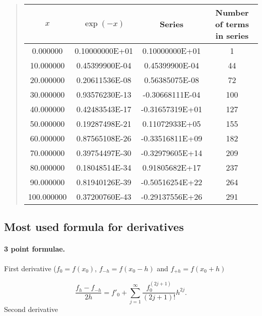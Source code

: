 \documentclass[%
oneside,                 %
final,                   %
10pt]{article}
\begin{document}
\begin{quote}
\begin{tabular}{cccc}
\hline
\multicolumn{1}{c}{ $x$ } & \multicolumn{1}{c}{ $\exp{(-x)}$ } & \multicolumn{1}{c}{ Series } & \multicolumn{1}{c}{ Number of terms in series } \\
\hline
0.000000   & 0.10000000E+01 & 0.10000000E+01  & 1                         \\
10.000000  & 0.45399900E-04 & 0.45399900E-04  & 44                        \\
20.000000  & 0.20611536E-08 & 0.56385075E-08  & 72                        \\
30.000000  & 0.93576230E-13 & -0.30668111E-04 & 100                       \\
40.000000  & 0.42483543E-17 & -0.31657319E+01 & 127                       \\
50.000000  & 0.19287498E-21 & 0.11072933E+05  & 155                       \\
60.000000  & 0.87565108E-26 & -0.33516811E+09 & 182                       \\
70.000000  & 0.39754497E-30 & -0.32979605E+14 & 209                       \\
80.000000  & 0.18048514E-34 & 0.91805682E+17  & 237                       \\
90.000000  & 0.81940126E-39 & -0.50516254E+22 & 264                       \\
100.000000 & 0.37200760E-43 & -0.29137556E+26 & 291                       \\
\hline
\end{tabular}
\end{quote}

\noindent



\subsection*{Most used formula for derivatives}


\paragraph{3 point formulae.}
First derivative  ($f_0 = f(x_0)$, $f_{-h}=f(x_0-h)$ and $f_{+h}=f(x_0+h)$

\[
   \frac{f_h-f_{-h}}{2h}=f'_0+\sum_{j=1}^{\infty}\frac{f_0^{(2j+1)}}{(2j+1)!}h^{2j}.
\]
Second derivative
\end{document}

